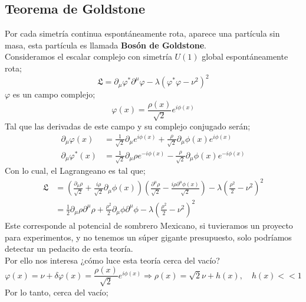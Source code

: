 \documentclass[../main.tex]{subfiles}
\begin{document}
  \subsection{Teorema de Goldstone}
  Por cada simetría continua espontáneamente rota, aparece una partícula sin masa, esta partícula es llamada \textbf{Bosón de Goldstone}. \\
  Consideramos el escalar complejo con simetría $U(1)$ global espontáneamente rota;
  \begin{equation}
    \mathfrak{L} = \partial_\mu \varphi^* \partial^\mu \varphi - \lambda \left( \varphi^* \varphi - \nu^2 \right)^2
   \end{equation}
   $\varphi$ es un campo complejo;
\begin{equation}
  \varphi(x) = \frac{\rho(x)}{\sqrt{2}} e^{i\phi(x)}
 \end{equation}
 Tal que las derivadas de este campo y su complejo conjugado serán;
 \begin{align}
   \partial_\mu \varphi(x) & = \frac{1}{\sqrt{2}} \partial_\mu e^{i\phi(x)} + \frac{\rho}{\sqrt{2}} \partial_\mu \phi(x) e^{i\phi(x)} \\
   \partial_\mu \varphi^*(x) & = \frac{1}{\sqrt{2}} \partial_\mu \rho e^{-i\phi(x)} - \frac{\rho}{\sqrt{2}} \partial_\mu \phi(x) e^{-i\phi(x)}
 \end{align} 
Con lo cual, el Lagrangeano es tal que;
\begin{align*}
  \mathfrak{L} & = \left( \frac{\partial_\mu\rho}{\sqrt{2}} + \frac{i\rho}{\sqrt{2}} \partial_\mu \phi(x) \right) \left( \frac{\partial^\mu \rho}{\sqrt{2}} - \frac{i\rho \partial^\mu \phi(x)}{\sqrt{2}} \right) - \lambda \left( \frac{\rho^2}{2} - \nu^2 \right)^2 \\
  & = \frac{1}{2} \partial_\mu \rho \partial^\mu \rho + \frac{\rho^2}{2} \partial_\mu \phi\partial^\mu \phi - \lambda \left( \frac{\rho^2}{2} - \nu^2 \right)^2
\end{align*}
Este corresponde al potencial de sombrero Mexicano, si tuvieramos un proyecto para experimentos, y no tenemos un súper gigante presupuesto, solo podríamos detectar un pedacito de esta teoría. \\
Por ello nos interesa ¿cómo luce esta teoría cerca del vacío?
\begin{equation}
  \varphi(x) = \nu + \delta \varphi(x) = \frac{\rho(x)}{\sqrt{2}} e^{i\phi(x)} \Rightarrow \rho(x) = \sqrt{2}\nu + h(x), \quad h(x)<<1
 \end{equation}
 Por lo tanto, cerca del vacío;
\end{document}
